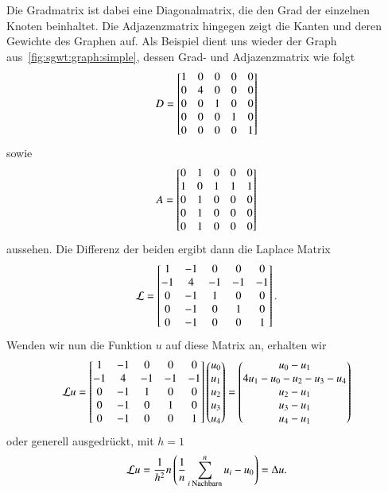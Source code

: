 Die Gradmatrix \degreeM{} ist dabei eine Diagonalmatrix, die den Grad der 
einzelnen Knoten beinhaltet. Die Adjazenzmatrix hingegen zeigt die Kanten und 
deren Gewichte des Graphen auf. Als Beispiel dient uns 
wieder der Graph aus~\cref{fig:sgwt:graph:simple}, dessen Grad- und 
Adjazenzmatrix wie folgt
\begin{equation*}
\degreeM =
\begin{bmatrix}
1 & 0 & 0 & 0 & 0 \\
0 & 4 & 0 & 0 & 0 \\
0 & 0 & 1 & 0 & 0 \\
0 & 0 & 0 & 1 & 0 \\
0 & 0 & 0 & 0 & 1
\end{bmatrix}
\end{equation*}
sowie
\begin{equation*}
\adjacencyM =
\begin{bmatrix}
0 & 1 & 0 & 0 & 0 \\
1 & 0 & 1 & 1 & 1 \\
0 & 1 & 0 & 0 & 0 \\
0 & 1 & 0 & 0 & 0 \\
0 & 1 & 0 & 0 & 0
\end{bmatrix}
\end{equation*}
aussehen. Die Differenz der beiden ergibt dann die Laplace Matrix
\begin{equation*}
\laplaceL =
\begin{bmatrix}
1 & -1 & 0 & 0 & 0 \\
-1 & 4 & -1 & -1 & -1 \\
0 & -1 & 1 & 0 & 0 \\
0 & -1 & 0 & 1 & 0 \\
0 & -1 & 0 & 0 & 1
\end{bmatrix}.
\end{equation*}
Wenden wir nun die Funktion $u$ auf diese Matrix an, erhalten wir
\begin{equation*}
\laplaceL u =
\begin{bmatrix}
1 & -1 & 0 & 0 & 0 \\
-1 & 4 & -1 & -1 & -1 \\
0 & -1 & 1 & 0 & 0 \\
0 & -1 & 0 & 1 & 0 \\
0 & -1 & 0 & 0 & 1
\end{bmatrix}
\begin{pmatrix}
u_0 \\
u_1 \\
u_2 \\
u_3 \\
u_4
\end{pmatrix}
=
\begin{pmatrix}
u_0 - u_1 \\
4 u_1 - u_0 - u_2 - u_3 - u_4 \\
u_2 - u_1 \\
u_3 - u_1 \\
u_4 - u_1
\end{pmatrix}
\end{equation*}
oder generell ausgedr\"uckt, mit $h = 1$
\begin{equation*}
\laplaceL u = \frac{1}{h^2}n\left(\frac{1}{n}\sum_{i\text{ Nachbarn}}^{n}u_i - 
u_0\right) = \Delta u.
\end{equation*}
